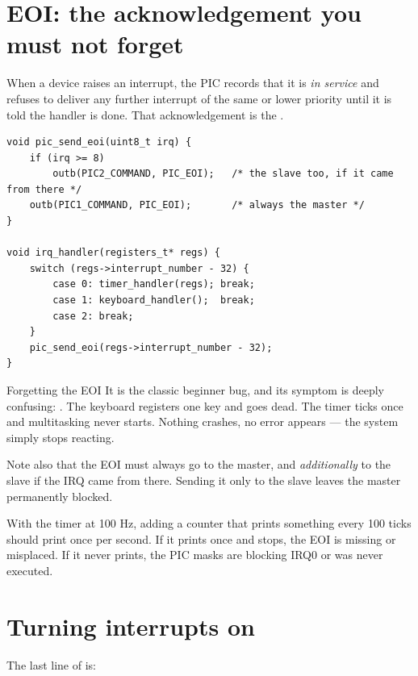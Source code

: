 \section{EOI: the acknowledgement you must not forget}

When a device raises an interrupt, the PIC records that it is \emph{in service} and refuses to
deliver any further interrupt of the same or lower priority until it is told the handler is done.
That acknowledgement is the .

\begin{lstlisting}[style=c]
void pic_send_eoi(uint8_t irq) {
    if (irq >= 8)
        outb(PIC2_COMMAND, PIC_EOI);   /* the slave too, if it came from there */
    outb(PIC1_COMMAND, PIC_EOI);       /* always the master */
}

void irq_handler(registers_t* regs) {
    switch (regs->interrupt_number - 32) {
        case 0: timer_handler(regs); break;
        case 1: keyboard_handler();  break;
        case 2: break;
    }
    pic_send_eoi(regs->interrupt_number - 32);
}
\end{lstlisting}

\begin{danger}{Forgetting the EOI}
It is the classic beginner bug, and its symptom is deeply confusing: . The keyboard registers one key and goes dead. The timer ticks once
and multitasking never starts. Nothing crashes, no error appears --- the system simply stops
reacting.

Note also that the EOI must always go to the master, and \emph{additionally} to the slave if the
IRQ came from there. Sending it only to the slave leaves the master permanently blocked.
\end{danger}

\begin{tryit}
With the timer at 100 Hz, adding a counter that prints something every 100 ticks should print once
per second. If it prints once and stops, the EOI is missing or misplaced. If it never prints, the
PIC masks are blocking IRQ0 or  was never executed.
\end{tryit}

\section{Turning interrupts on}

The last line of  is:

